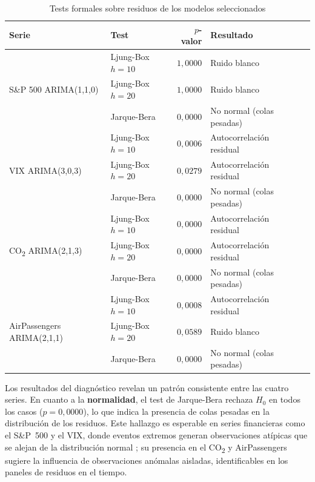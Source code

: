 \documentclass[12pt, a4paper]{article}
\begin{document}
\begin{table}[H]
    \centering
    \caption{Tests formales sobre residuos de los modelos seleccionados}
    \label{tab:tests_residuos}
    \begin{tabular}{llrll}
        \toprule
        \textbf{Serie} & \textbf{Test} & \textbf{$p$-valor} & \textbf{Resultado} \\
        \midrule
        \multirow{3}{*}{S\&P 500 ARIMA(1,1,0)}
            & Ljung-Box $h=10$ & $1{,}0000$ & Ruido blanco \\
            & Ljung-Box $h=20$ & $1{,}0000$ & Ruido blanco \\
            & Jarque-Bera      & $0{,}0000$ & No normal (colas pesadas) \\
        \midrule
        \multirow{3}{*}{VIX ARIMA(3,0,3)}
            & Ljung-Box $h=10$ & $0{,}0006$ & Autocorrelación residual \\
            & Ljung-Box $h=20$ & $0{,}0279$ & Autocorrelación residual \\
            & Jarque-Bera      & $0{,}0000$ & No normal (colas pesadas) \\
        \midrule
        \multirow{3}{*}{CO\textsubscript{2} ARIMA(2,1,3)}
            & Ljung-Box $h=10$ & $0{,}0000$ & Autocorrelación residual \\
            & Ljung-Box $h=20$ & $0{,}0000$ & Autocorrelación residual \\
            & Jarque-Bera      & $0{,}0000$ & No normal (colas pesadas) \\
        \midrule
        \multirow{3}{*}{AirPassengers ARIMA(2,1,1)}
            & Ljung-Box $h=10$ & $0{,}0008$ & Autocorrelación residual \\
            & Ljung-Box $h=20$ & $0{,}0589$ & Ruido blanco \\
            & Jarque-Bera      & $0{,}0000$ & No normal (colas pesadas) \\
        \bottomrule
    \end{tabular}
\end{table}

Los resultados del diagnóstico revelan un patrón consistente entre las cuatro series. En cuanto a la \textbf{normalidad}, el test de Jarque-Bera rechaza $H_0$ en todos los casos ($p = 0{,}0000$), lo que indica la presencia de colas pesadas en la distribución de los residuos. Este hallazgo es esperable en series financieras como el S\&P~500 y el VIX, donde eventos extremos generan observaciones atípicas que se alejan de la distribución normal \cite{tsay2005}; su presencia en el CO\textsubscript{2} y AirPassengers sugiere la influencia de observaciones anómalas aisladas, identificables en los paneles de residuos en el tiempo.
\end{document}
